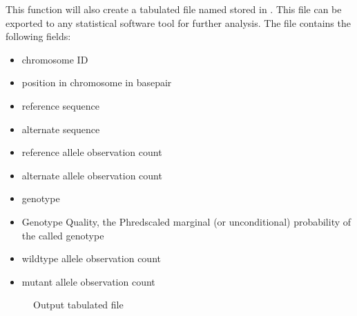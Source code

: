 \documentclass[letterpaper,10pt,english]{sphinxhowto}
\begin{document}
\sphinxAtStartPar
This function will also create a tabulated  file named  stored in . This file can be exported to any statistical software tool for further analysis. The file contains the following fields:
\begin{itemize}
\item {} 
\sphinxAtStartPar
{} \sphinxhyphen{} chromosome ID

\item {} 
\sphinxAtStartPar
{} \sphinxhyphen{} position in chromosome in base\sphinxhyphen{}pair

\item {} 
\sphinxAtStartPar
{} \sphinxhyphen{} reference sequence

\item {} 
\sphinxAtStartPar
{} \sphinxhyphen{} alternate sequence

\item {} 
\sphinxAtStartPar
{} \sphinxhyphen{} reference allele observation count

\item {} 
\sphinxAtStartPar
{} \sphinxhyphen{} alternate allele observation count

\item {} 
\sphinxAtStartPar
{} \sphinxhyphen{} genotype

\item {} 
\sphinxAtStartPar
{} \sphinxhyphen{} Genotype Quality, the Phred\sphinxhyphen{}scaled marginal (or unconditional) probability of the called genotype

\item {} 
\sphinxAtStartPar
{} \sphinxhyphen{} wild\sphinxhyphen{}type allele observation count

\item {} 
\sphinxAtStartPar
{} \sphinxhyphen{} mutant allele observation count

\end{itemize}

\begin{figure}[htbp]
\centering
\capstart

\noindent{}
\caption{Output tabulated file}\label{\detokenize{index:id2}}\end{figure}
\end{document}

